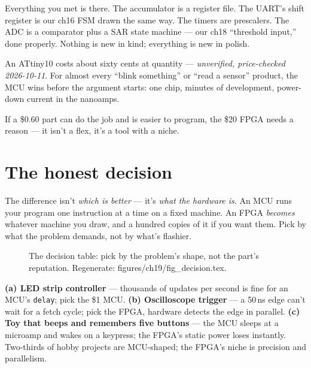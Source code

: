Everything you met is there. The accumulator is a register file.
The UART's shift register is our ch16 FSM drawn the same way.
The timers are prescalers. The ADC is a comparator plus a SAR
state machine --- our ch18 ``threshold input,'' done properly.
Nothing is new in kind; everything is new in polish.

\begin{example}
An ATtiny10 costs about sixty cents at quantity
--- \emph{unverified, price-checked 2026-10-11}. For almost every
``blink something'' or ``read a sensor'' product, the MCU wins
before the argument starts: one chip, minutes of development,
power-down current in the nanoamps.
\end{example}

\begin{checkpoint}
If a \$0.60 part can do the job and is easier to program, the
\$20 FPGA needs a reason --- it isn't a flex, it's a tool with a
niche.
\end{checkpoint}

\section{The honest decision}\label{sec:decision19}

The difference isn't \emph{which is better} --- it's \emph{what the
hardware is}. An MCU runs your program one instruction at a time on
a fixed machine. An FPGA \emph{becomes} whatever machine you draw,
and a hundred copies of it if you want them. Pick by what the
problem demands, not by what's flashier.

\begin{figure}[htbp]
\centering

\caption{The decision table: pick by the problem's shape, not the
part's reputation. Regenerate: \ttfamily
figures/ch19/fig\_decision.tex.}
\label{fig:decision19}
\end{figure}

\begin{example}
\textbf{(a) LED strip controller} --- thousands of updates per second
is fine for an MCU's \texttt{delay}; pick the \$1 MCU. \textbf{(b)
Oscilloscope trigger} --- a 50\,ns edge can't wait for a fetch
cycle; pick the FPGA, hardware detects the edge in parallel.
\textbf{(c) Toy that beeps and remembers five buttons} --- the MCU
sleeps at a microamp and wakes on a keypress; the FPGA's static
power loses instantly. Two-thirds of hobby projects are
MCU-shaped; the FPGA's niche is precision and parallelism.
\end{example}

